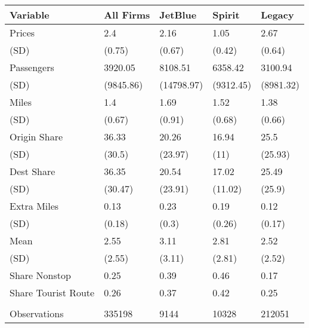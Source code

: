 
\begin{tabular}[t]{lllll}
\toprule
Variable & All Firms & JetBlue & Spirit & Legacy\\
\midrule
Prices & 2.4 & 2.16 & 1.05 & 2.67\\
(SD) & (0.75) & (0.67) & (0.42) & (0.64)\\
Passengers & 3920.05 & 8108.51 & 6358.42 & 3100.94\\
(SD) & (9845.86) & (14798.97) & (9312.45) & (8981.32)\\
Miles & 1.4 & 1.69 & 1.52 & 1.38\\
(SD) & (0.67) & (0.91) & (0.68) & (0.66)\\
Origin Share & 36.33 & 20.26 & 16.94 & 25.5\\
(SD) & (30.5) & (23.97) & (11) & (25.93)\\
Dest Share & 36.35 & 20.54 & 17.02 & 25.49\\
(SD) & (30.47) & (23.91) & (11.02) & (25.9)\\
Extra Miles & 0.13 & 0.23 & 0.19 & 0.12\\
(SD) & (0.18) & (0.3) & (0.26) & (0.17)\\
Mean & 2.55 & 3.11 & 2.81 & 2.52\\
(SD) & (2.55) & (3.11) & (2.81) & (2.52)\\
Share Nonstop & 0.25 & 0.39 & 0.46 & 0.17\\
Share Tourist Route & 0.26 & 0.37 & 0.42 & 0.25\\
\midrule\\
Observations & 335198 & 9144 & 10328 & 212051\\
\bottomrule
\end{tabular}
